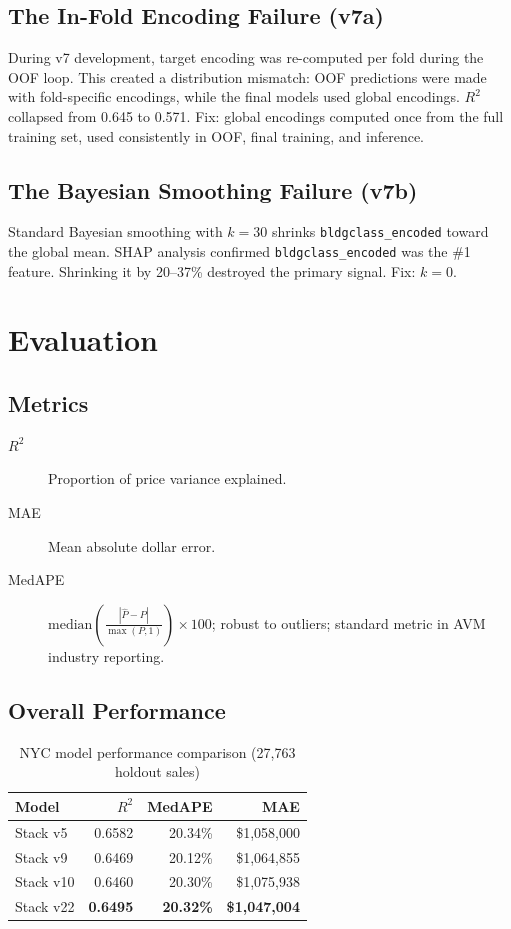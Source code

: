 \documentclass[11pt, a4paper, twoside]{article}
\begin{document}
\subsection{The In-Fold Encoding Failure (v7a)}
\label{sec:infold_fail}
During v7 development, target encoding was re-computed per fold during the OOF
loop. This created a distribution mismatch: OOF predictions were made with
fold-specific encodings, while the final models used global encodings. $R^2$
collapsed from 0.645 to 0.571. Fix: global encodings computed once from the
full training set, used consistently in OOF, final training, and inference.

\subsection{The Bayesian Smoothing Failure (v7b)}
Standard Bayesian smoothing with $k=30$ shrinks \texttt{bldgclass\_encoded}
toward the global mean. SHAP analysis confirmed \texttt{bldgclass\_encoded} was
the \#1 feature. Shrinking it by 20--37\% destroyed the primary signal. Fix:
$k=0$.

\section{Evaluation}
\label{sec:evaluation}

\subsection{Metrics}
\begin{description}
  \item[$R^2$] Proportion of price variance explained.
  \item[MAE] Mean absolute dollar error.
  \item[MedAPE] $\text{median}\!\left(\tfrac{|\hat{P}-P|}{\max(P,1)}\right)\times 100$;
                robust to outliers; standard metric in AVM industry reporting.
\end{description}

\subsection{Overall Performance}

\begin{table}[H]
  \centering
  \caption{NYC model performance comparison (27,763 holdout sales)}
  \label{tab:overall_perf}
  \begin{tabular}{lrrr}
    \toprule
    Model & $R^2$ & MedAPE & MAE \\
    \midrule
    Stack v5  & 0.6582 & 20.34\% & \$1,058,000 \\
    Stack v9  & 0.6469 & 20.12\% & \$1,064,855 \\
    Stack v10 & 0.6460 & 20.30\% & \$1,075,938 \\
    Stack v22 & \textbf{0.6495} & \textbf{20.32\%} & \textbf{\$1,047,004} \\
    \bottomrule
  \end{tabular}
\end{table}
\end{document}
